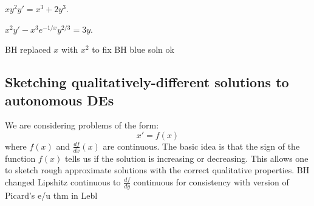 \documentclass[12pt]{book}
\begin{document}

\begin{exercise}
$x y^2 y'= x^3 + 2y^3$.
\end{exercise}


\begin{exercise}
$x^2y'-x^3 e^{-1/x} y^{2/3} = 3y$.
\end{exercise}

{\color{teal}BH replaced $x$ with $x^2$ to fix
BH blue soln ok}

\newpage 
\subsection{Sketching qualitatively-different solutions to autonomous DEs}

We are considering problems of the form:
$$x' = f(x)$$
where $f(x)$ and $\frac{df}{dx}(x)$ are continuous. The basic idea is that the sign of the function $f(x)$ tells us if
the solution is increasing or decreasing. This allows one to sketch rough approximate solutions with the correct qualitative properties.
{\color{teal}BH changed Lipshitz continuous to $\frac{df}{dy}$ continuous for
consistency with version of Picard's e/u thm in Lebl}
\end{document}
